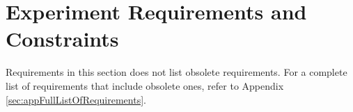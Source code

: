\pagebreak
\section{Experiment Requirements and Constraints}
Requirements in this section does not list obsolete requirements. For a complete list of requirements that include obsolete ones, refer to Appendix \ref{sec:appFullListOfRequirements}.



\pagebreak

\pagebreak



